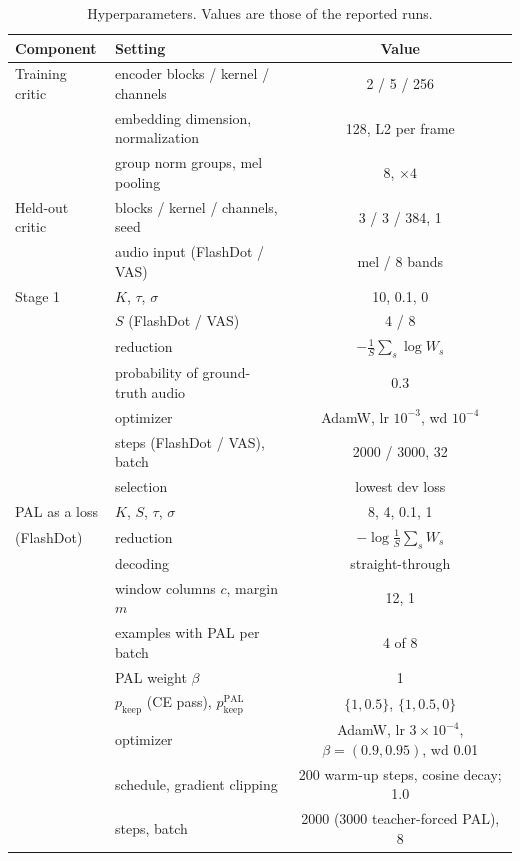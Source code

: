\begin{table}[h]
  \centering
  \caption{Hyperparameters. Values are those of the reported runs.}
  \label{tab:hparams}
  \small
  \begin{tabular}{llc}
    \toprule
    Component & Setting & Value \\
    \midrule
    Training critic & encoder blocks / kernel / channels & 2 / 5 / 256 \\
           & embedding dimension, normalization & 128, L2 per frame \\
           & group norm groups, mel pooling & 8, $\times 4$ \\
    Held-out critic & blocks / kernel / channels, seed & 3 / 3 / 384, 1 \\
           & audio input (FlashDot / VAS) & mel / 8 bands \\
    \midrule
    Stage 1 & $K$, $\tau$, $\sigma$ & 10, 0.1, 0 \\
            & $S$ (FlashDot / VAS) & 4 / 8 \\
            & reduction & $-\frac{1}{S}\sum_s \log W_s$ \\
            & probability of ground-truth audio & 0.3 \\
            & optimizer & AdamW, lr $10^{-3}$, wd $10^{-4}$ \\
            & steps (FlashDot / VAS), batch & 2000 / 3000, 32 \\
            & selection & lowest dev loss \\
    \midrule
    PAL as a loss & $K$, $S$, $\tau$, $\sigma$ & 8, 4, 0.1, 1 \\
    (FlashDot) & reduction & $-\log \frac{1}{S}\sum_s W_s$ \\
            & decoding & straight-through \\
            & window columns $c$, margin $m$ & 12, 1 \\
            & examples with PAL per batch & 4 of 8 \\
            & PAL weight $\beta$ & 1 \\
            & $p_{\mathrm{keep}}$ (CE pass), $p^{\mathrm{PAL}}_{\mathrm{keep}}$ & $\{1, 0.5\}$, $\{1, 0.5, 0\}$ \\
            & optimizer & AdamW, lr $3 \times 10^{-4}$, $\beta = (0.9, 0.95)$, wd 0.01 \\
            & schedule, gradient clipping & 200 warm-up steps, cosine decay; 1.0 \\
            & steps, batch & 2000 (3000 teacher-forced PAL), 8 \\

\end{tabular}
\end{table}
